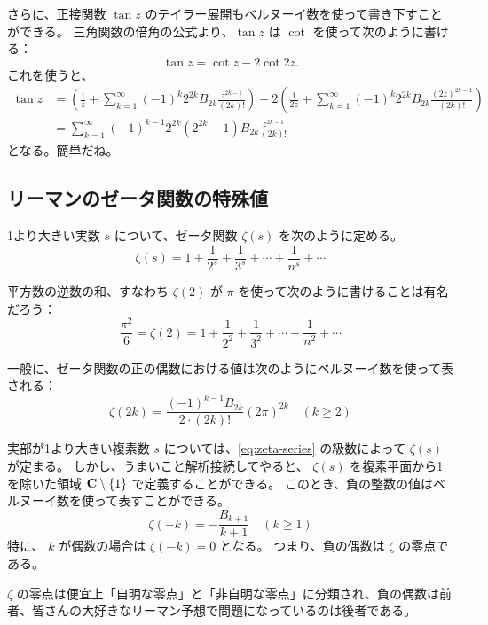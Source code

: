 {さらに、正接関数 $\tan z$ のテイラー展開もベルヌーイ数を使って書き下すことができる。
三角関数の倍角の公式より、$\tan z$ は $\cot$ を使って次のように書ける：
\[\tan z=\cot z-2\cot 2z.\]
これを使うと、
\begin{align*}
  \tan z&=\left(\frac{1}{z}+\sum_{k=1}^\infty (-1)^k 2^{2k} B_{2k}\frac{z^{2k-1}}{(2k)!}\right)
          -2\left(\frac{1}{2z}+\sum_{k=1}^\infty (-1)^k 2^{2k} B_{2k}\frac{(2z)^{2k-1}}{(2k)!}\right) \\
        &=\sum_{k=1}^\infty (-1)^{k-1} 2^{2k} (2^{2k}-1)  B_{2k}\frac{z^{2k-1}}{(2k)!}
\end{align*}
となる。簡単だね。

\subsection{リーマンのゼータ関数の特殊値}
1より大きい実数 $s$ について、ゼータ関数 $\zeta(s)$ を次のように定める。
\begin{equation} \label{eq:zeta-series}
  \zeta(s)=1+\frac{1}{2^s}+\frac{1}{3^s}+\dotsb+\frac{1}{n^s}+\dotsb
\end{equation}

平方数の逆数の和、すなわち $\zeta(2)$ が $\pi$ を使って次のように書けることは有名だろう：
\[\frac{\pi^2}{6}=\zeta(2)=1+\frac{1}{2^2}+\frac{1}{3^2}+\dotsb+\frac{1}{n^2}+\dotsb\]

一般に、ゼータ関数の正の偶数における値は次のようにベルヌーイ数を使って表される：
\[\zeta(2k)=\frac{(-1)^{k-1}B_{2k}}{2\cdot(2k)!}(2\pi)^{2k} \quad (k\ge 2)\]

実部が1より大きい複素数 $s$ については、\autoref{eq:zeta-series} の級数によって $\zeta(s)$ が定まる。
しかし、うまいこと解析接続してやると、 $\zeta(s)$ を複素平面から1を除いた領域 $\mathbf{C}\setminus\{1\}$ で定義することができる。
このとき、負の整数の値はベルヌーイ数を使って表すことができる。
\[\zeta(-k)=-\frac{B_{k+1}}{k+1}\quad (k\ge 1)\]
特に、 $k$ が偶数の場合は $\zeta(-k)=0$ となる。
つまり、負の偶数は $\zeta$ の零点である。

$\zeta$ の零点は便宜上「自明な零点」と「非自明な零点」に分類され、負の偶数は前者、皆さんの大好きなリーマン予想で問題になっているのは後者である。

\addtocounter{chapter}{1} %
\setcounter{section}{0}
\renewcommand{\thesection}{おまけ\arabic{section}}
}
